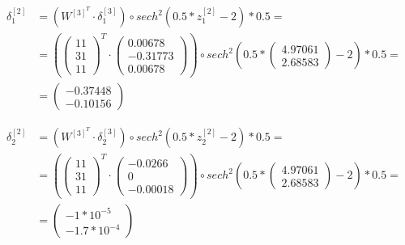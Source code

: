 \documentclass[12pt]{article}
\begin{document}
\begin{enumerate}[leftmargin=\labelsep]
          \begin{align*}
            \delta^{[2]}_1 &= (W^{[3]^{T}} \cdot \delta^{[3]}_1) \circ  sech^{2}(0.5*z^{[2]}_1 - 2) * 0.5 = \\
             &= (\begin{pmatrix} 1 1 \\ 3 1 \\ 1 1\end{pmatrix}^{T} \cdot \begin{pmatrix} 0.00678 \\ -0.31773 \\ 0.00678 \end{pmatrix}) \circ sech^{2}(0.5*\begin{pmatrix} 4.97061 \\ 2.68583\end{pmatrix} - 2) * 0.5 = \\
             &= \begin{pmatrix} -0.37448 \\ -0.10156 \end{pmatrix}
          \end{align*}

          \begin{align*}
            \delta^{[2]}_2 &= (W^{[3]^{T}} \cdot \delta^{[3]}_2) \circ  sech^{2}(0.5*z^{[2]}_2 - 2) * 0.5 = \\
             &= (\begin{pmatrix} 1 1 \\ 3 1 \\ 1 1\end{pmatrix}^{T} \cdot \begin{pmatrix} -0.0266 \\ 0 \\ -0.00018 \end{pmatrix}) \circ sech^{2}(0.5*\begin{pmatrix} 4.97061 \\ 2.68583\end{pmatrix} - 2) * 0.5 = \\
             &= \begin{pmatrix} -1 * 10^{-5} \\ -1.7 * 10^{-4} \end{pmatrix}
          \end{align*}


\end{enumerate}
\end{document}
